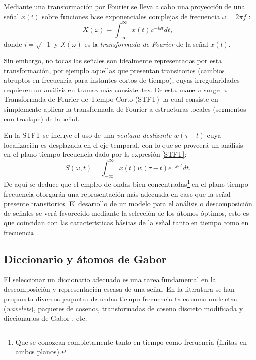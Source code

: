 Mediante una transformación por Fourier se lleva a cabo una proyección de una señal $x(t)$ sobre funciones base exponenciales complejas de frecuencia $\omega = 2\pi f$ :
\begin{equation}\label{transFourier}
	X(\omega) = \int_{-\infty}^{\infty}x(t) e^{-i\omega t} dt,
\end{equation}
donde $i=\sqrt{-1}$ y $X(\omega)$ es la \emph{transformada de Fourier} de la señal $x(t)$.

Sin embargo, no todas las señales son idealmente representadas por esta transformación, por ejemplo aquellas que presentan transitorios (cambios abruptos en frecuencia para instantes cortos de tiempo), cuyas irregularidades  requieren un análisis en tramos más consistentes. De esta manera surge la Transformada de Fourier de Tiempo Corto (STFT), la cual consiste en simplemente aplicar la transformada de Fourier a estructuras locales (segmentos con traslape) de la señal. 

En la STFT se incluye el uso de una \emph{ventana deslizante} $w(\tau - t)$ cuya localización es desplazada en el eje temporal, con lo que se proveerá un análisis en el plano tiempo frecuencia dado por la expresión \ref{STFT}:
\begin{equation}\label{STFT}
	S(\omega,t) = \int_{-\infty}^{\infty}x(t)w(\tau-t) e^{-j\omega t} dt.
\end{equation}
De aquí se deduce que el empleo de ondas bien concentradas\footnote{Que se conozcan completamente tanto en tiempo como frecuencia (finitas en ambos planos).} en el plano tiempo-frecuencia otorgarán una representación más adecuada en caso que la señal presente transitorios. El desarrollo de un modelo para el análisis o descomposición de señales se verá favorecido mediante la selección de los átomos óptimos, esto es que coincidan con las características básicas de la señal tanto en tiempo como en frecuencia \cite[]{Mallat1999}.

\subsection{Diccionario y átomos de Gabor}
El seleccionar un diccionario adecuado es una tarea fundamental en la descomposición y representación escasa de una señal. En la literatura se han propuesto diversos paquetes de ondas tiempo-frecuencia tales como ondeletas (\emph{wavelets}), paquetes de cosenos, transformadas de coseno discreto modificada y diccionarios de Gabor \cite[]{Wolfe2001}, etc. 

